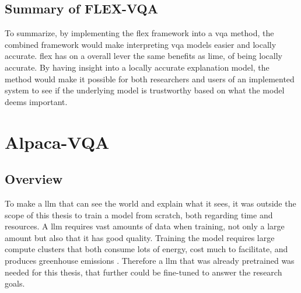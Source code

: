         \subsection{Summary of FLEX-VQA}
        To summarize, by implementing the \gls{flex} framework into a \gls{vqa} method, the combined framework would make interpreting \gls{vqa} models easier and locally accurate. \gls{flex} has on a overall lever the same benefits as \gls{lime}, of being locally accurate. By having insight into a locally accurate explanation model, the method would make it possible for both researchers and users of an implemented system to see if the underlying model is trustworthy based on what the model deems important. 




    \section{Alpaca-VQA}

        \subsection{Overview}
        To make a \gls{llm} that can see the world and explain what it sees, it was outside the scope of this thesis to train a model from scratch, both regarding time and resources. A \gls{llm} requires vast amounts of data when training, not only a large amount but also that it has good quality. Training the model requires large compute clusters that both consume lots of energy, cost much to facilitate, and produces greenhouse emissions \cite{??}. Therefore a \gls{llm} that was already pretrained was needed for this thesis, that further could be fine-tuned to answer the research goals. 

